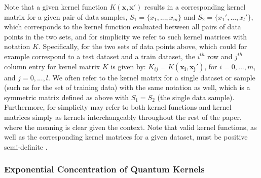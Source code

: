 \documentclass[reprint,amsfonts, amssymb, amsmath,  showkeys, nofootinbib,pra, superscriptaddress, twocolumn,longbibliography]{revtex4-2}
\renewcommand{\vec}[1]{\boldsymbol{#1}}  %
\begin{document}
Note that a given kernel function $K(\vec{x},\vec{x}')$ results in a corresponding kernel matrix for a given pair of data samples, $S_1=\{ x_1,...,x_m \}$ and $S_2=\{ x_1',...,x_l' \}$, which corresponds to the kernel function evaluated between all pairs of data points in the two sets, and for simplicity we refer to such kernel matrices with notation $K$. Specifically, for the two sets of data points above, which could for example correspond to a test dataset and a train dataset, the $i^{th}$ row and $j^{th}$ column entry for kernel matrix $K$ is given by: $K_{ij} = K(\vec{x_i},\vec{x_j'})$, for $i=0, ..., m$, and $j=0, ..., l$.  We often refer to the kernel matrix for a single dataset or sample (such as for the set of training data) with the same notation as well, which is a symmetric matrix defined as above with $S_1 = S_2$ (the single data sample).  Furthermore, for simplicity may refer to both kernel functions and kernel matrices simply as kernels interchangeably  throughout the rest of the paper, where the meaning is clear given the context.  Note that valid kernel functions, as well as the corresponding kernel matrices for a given dataset, must be positive semi-definite \cite{scholkopf2002learning}.

\subsubsection{Exponential Concentration of Quantum Kernels}\label{exponential_concentration}
\end{document}
